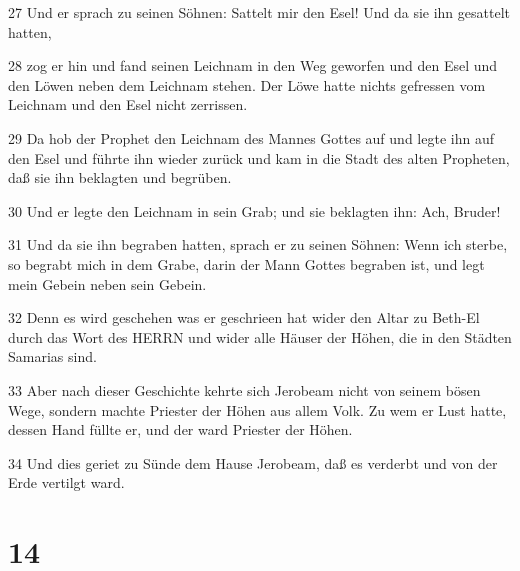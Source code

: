 \par 27 Und er sprach zu seinen Söhnen: Sattelt mir den Esel! Und da sie ihn gesattelt hatten,
\par 28 zog er hin und fand seinen Leichnam in den Weg geworfen und den Esel und den Löwen neben dem Leichnam stehen. Der Löwe hatte nichts gefressen vom Leichnam und den Esel nicht zerrissen.
\par 29 Da hob der Prophet den Leichnam des Mannes Gottes auf und legte ihn auf den Esel und führte ihn wieder zurück und kam in die Stadt des alten Propheten, daß sie ihn beklagten und begrüben.
\par 30 Und er legte den Leichnam in sein Grab; und sie beklagten ihn: Ach, Bruder!
\par 31 Und da sie ihn begraben hatten, sprach er zu seinen Söhnen: Wenn ich sterbe, so begrabt mich in dem Grabe, darin der Mann Gottes begraben ist, und legt mein Gebein neben sein Gebein.
\par 32 Denn es wird geschehen was er geschrieen hat wider den Altar zu Beth-El durch das Wort des HERRN und wider alle Häuser der Höhen, die in den Städten Samarias sind.
\par 33 Aber nach dieser Geschichte kehrte sich Jerobeam nicht von seinem bösen Wege, sondern machte Priester der Höhen aus allem Volk. Zu wem er Lust hatte, dessen Hand füllte er, und der ward Priester der Höhen.
\par 34 Und dies geriet zu Sünde dem Hause Jerobeam, daß es verderbt und von der Erde vertilgt ward.

\chapter{14}

